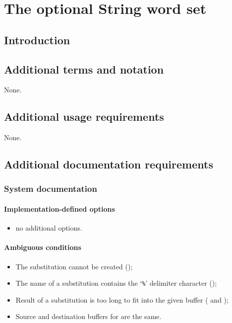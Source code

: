 
\chapter{The optional String word set} %

\section{Introduction} %

\section{Additional terms and notation} %

None.

\section{Additional usage requirements} %

None.

\section{Additional documentation requirements} %
\label{string:document}

\subsection{System documentation}
\subsubsection{Implementation-defined options}
\begin{itemize}
\item no additional options.
\end{itemize}

\subsubsection{Ambiguous conditions}
\begin{itemize}
\item The substitution cannot be created ();
\item The name of a substitution contains the `\texttt{\%}' delimiter character ();
\item Result of a substitution is too long to fit into the given buffer ( and );
\item Source and destination buffers for  are the same.
\end{itemize}

